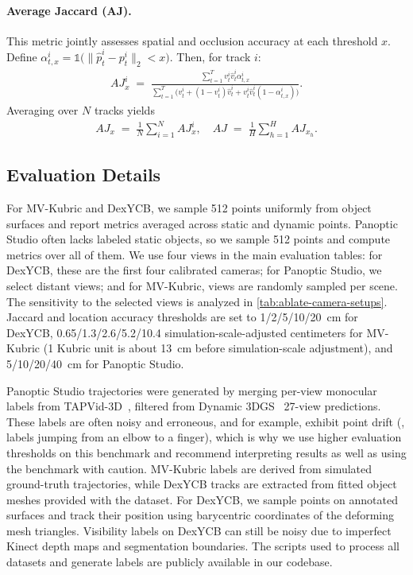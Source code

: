\paragraph{Average Jaccard (AJ).}
This metric jointly assesses spatial and occlusion accuracy at each threshold $x$. Define $\alpha_{t,x}^i = \mathds{1}\!\bigl(\|\hat{p}_t^i - p_t^i\|_2 < x\bigr)$. Then, for track $i$:
\begin{align}
  AJ_x^i
  \;=\;
  \frac{
        \sum_{t=1}^{T}
        v_t^i\hat{v}_t^i\alpha_{t,x}^i
    }{
        \sum_{t=1}^{T}
        \bigl(
            v_t^i
            + (1 - v_t^i)\hat{v}_t^i
            + v_t^i\hat{v}_t^i(1-\alpha_{t,x}^i)
        \bigr)
    }.
\end{align}
Averaging over $N$ tracks yields
\begin{align}
  AJ_x
  \;=\;
  \tfrac{1}{N}\sum_{i=1}^N AJ_x^i,
  \quad
  AJ
  \;=\;
  \tfrac{1}{H}\sum_{h=1}^H AJ_{x_h}.
\end{align}

\subsection{Evaluation Details}

For MV-Kubric and DexYCB, we sample 512 points uniformly from object surfaces and report metrics averaged across static and dynamic points. Panoptic Studio often lacks labeled static objects, so we sample 512 points and compute metrics over all of them. We use four views in the main evaluation tables: for DexYCB, these are the first four calibrated cameras; for Panoptic Studio, we select distant views; and for MV-Kubric, views are randomly sampled per scene. The sensitivity to the selected views is analyzed in \cref{tab:ablate-camera-setups}. Jaccard and location accuracy thresholds are set to 1/2/5/10/20~cm for DexYCB, 0.65/1.3/2.6/5.2/10.4 simulation-scale-adjusted centimeters for MV-Kubric (1 Kubric unit is about 13~cm before simulation-scale adjustment), and 5/10/20/40~cm for Panoptic Studio.

Panoptic Studio trajectories were generated by merging per-view monocular labels from TAPVid-3D~\cite{doersch2023tapvid}, filtered from Dynamic 3DGS~\cite{luiten2023dynamic} 27-view predictions. These labels are often noisy and erroneous, and for example, exhibit point drift (\eg, labels jumping from an elbow to a finger), which is why we use higher evaluation thresholds on this benchmark and recommend interpreting results as well as using the benchmark with caution. MV-Kubric labels are derived from simulated ground-truth trajectories, while DexYCB tracks are extracted from fitted object meshes provided with the dataset. For DexYCB, we sample points on annotated surfaces and track their position using barycentric coordinates of the deforming mesh triangles. Visibility labels on DexYCB can still be noisy due to imperfect Kinect depth maps and segmentation boundaries. The scripts used to process all datasets and generate labels are publicly available in our codebase.




